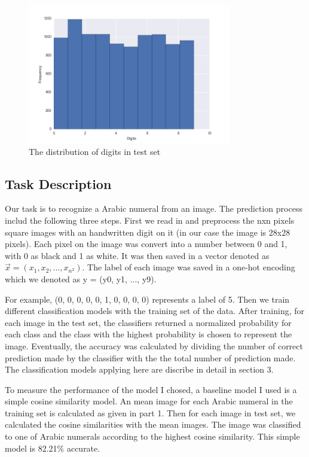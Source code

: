 \documentclass{article}
\begin{document}
\begin{figure}[!h]
\centering
\includegraphics[width=3.5in]{image/test_data_dist}
\caption{The distribution of digits in test set}
\label{data_dist}
\end{figure}


\subsection{Task Description}

Our task is to recognize a Arabic numeral from an image. The prediction process includ the following three steps. First we read in and preprocess the nxn pixels square images with an handwritten digit on it (in our case the image is 28x28 pixels). Each pixel on the image was convert into a number between 0 and 1, with 0 as black and 1 as white. It was then saved in a vector denoted as $\vec x = (x_1, x_2, ..., x_{n^2} )$. The label of each image was saved in a one-hot encoding which we denoted as y = (y0, y1, ..., y9). 

For example, (0, 0, 0, 0, 0, 1, 0, 0, 0, 0) represents a label of 5. Then we train different classification models with the training set of the data. After training, for each image in the test set, the classifiers returned a normalized probability for each class and the class with the highest probability is chosen to represent the image. Eventually, the accuracy was calculated by dividing the number of correct prediction made by the classifier with the the total number of prediction made. The classification models applying here are discribe in detail in section 3.

To measure the performance of the model I chosed, a baseline model I used is a simple cosine similarity model. An mean image for each Arabic numeral in the training set is calculated as given in part 1. Then for each image in test set, we calculated the cosine similarities with the mean images. The image was classified to one of Arabic numerals according to the highest cosine similarity. This simple model is 82.21$\%$ accurate.
\end{document}
